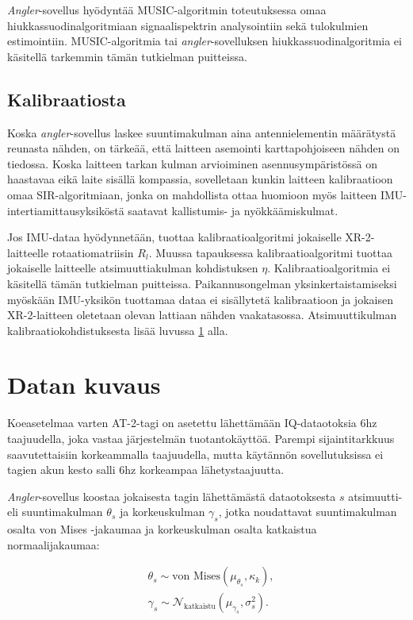 \documentclass[
  12pt,
  a4paper, twoside]{book}
\begin{document}
\emph{Angler}-sovellus hyödyntää MUSIC-algoritmin toteutuksessa omaa hiukkassuodinalgoritmiaan signaalispektrin analysointiin sekä tulokulmien estimointiin. MUSIC-algoritmia tai \emph{angler}-sovelluksen hiukkassuodinalgoritmia ei käsitellä tarkemmin tämän tutkielman puitteissa.

\subsection{Kalibraatiosta}

Koska \emph{angler}-sovellus laskee suuntimakulman aina antennielementin määrätystä reunasta nähden, on tärkeää, että laitteen asemointi karttapohjoiseen nähden on tiedossa. Koska laitteen tarkan kulman arvioiminen asennusympäristössä on haastavaa eikä laite sisällä kompassia, sovelletaan kunkin laitteen kalibraatioon omaa SIR-algoritmiaan, jonka on mahdollista ottaa huomioon myös laitteen IMU-intertiamittausyksiköstä saatavat kallistumis- ja nyökkäämiskulmat.

Jos IMU-dataa hyödynnetään, tuottaa kalibraatioalgoritmi jokaiselle XR-2-laitteelle rotaatiomatriisin \(R_l\). Muussa tapauksessa kalibraatioalgoritmi tuottaa jokaiselle laitteelle atsimuuttiakulman kohdistuksen \(\eta\). Kalibraatioalgoritmia ei käsitellä tämän tutkielman puitteissa. Paikannusongelman yksinkertaistamiseksi myöskään IMU-yksikön tuottamaa dataa ei sisällytetä kalibraatioon ja jokaisen XR-2-laitteen oletetaan olevan lattiaan nähden vaakatasossa. Atsimuuttikulman kalibraatiokohdistuksesta lisää luvussa \ref{datan-kuvaus} alla.

\section{Datan kuvaus} \label{datan-kuvaus}

Koeasetelmaa varten AT-2-tagi on asetettu lähettämään IQ-dataotoksia 6hz taajuudella, joka vastaa järjestelmän tuotantokäyttöä. Parempi sijaintitarkkuus saavutettaisiin korkeammalla taajuudella, mutta käytännön sovellutuksissa ei tagien akun kesto salli 6hz korkeampaa lähetystaajuutta.

\emph{Angler}-sovellus koostaa jokaisesta tagin lähettämästä dataotoksesta \(s\) atsimuutti- eli suuntimakulman \(\theta_s\) ja korkeuskulman \(\gamma_s\), jotka noudattavat suuntimakulman osalta von Mises -jakaumaa ja korkeuskulman osalta katkaistua normaalijakaumaa:

\begin{align}
&\theta_{s} \sim \text{von Mises}(\mu_{\theta_s}, \kappa_k),\\
&\gamma_{s} \sim \mathcal{N}_{\text{katkaistu}} (\mu_{\gamma_s}, \sigma^2_s).
\end{align}
\end{document}
